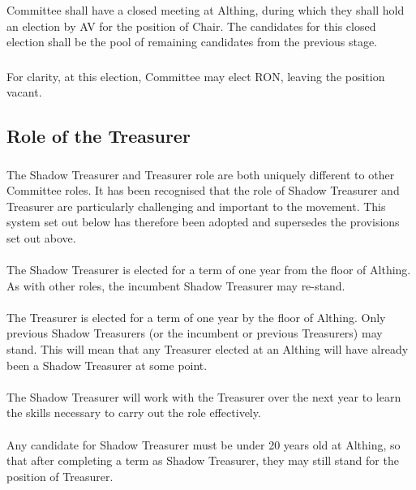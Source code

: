\documentclass[a4paper, 11pt]{report}
\begin{document}
\subsubsection{}
Committee shall have a closed meeting at Althing, during which they shall hold an election by AV for the position of Chair.  The candidates for this closed election shall be the pool of remaining candidates from the previous stage.

\subsubsection{}
For clarity, at this election, Committee may elect RON, leaving the position vacant.

\subsection{Role of the Treasurer}
\label{sec:treasurer}
\subsubsection{}
The Shadow Treasurer and Treasurer role are both uniquely different to other Committee roles. It has been recognised that the role of Shadow Treasurer and Treasurer are particularly challenging and important to the movement. This system set out below has therefore been adopted and supersedes the provisions set out above.
\paragraph{}
The Shadow Treasurer is elected for a term of one year from the floor of Althing. As with other roles, the incumbent Shadow Treasurer may re-stand.
\paragraph{}
The Treasurer is elected for a term of one year by the floor of Althing. Only previous Shadow Treasurers (or the incumbent or previous Treasurers) may stand.  This will mean that any Treasurer elected at an Althing will have already been a Shadow Treasurer at some point.
\paragraph{}
The Shadow Treasurer will work with the Treasurer over the next year to learn the skills necessary to carry out the role effectively.
\paragraph{}
Any candidate for Shadow Treasurer must be under 20 years old at Althing, so that after completing a term as Shadow Treasurer, they may still stand for the position of Treasurer.
\end{document}
